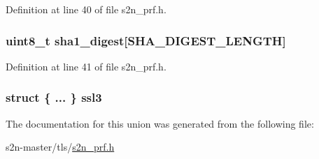Definition at line 40 of file s2n\+\_\+prf.\+h.

\subsubsection[{\texorpdfstring{sha1\+\_\+digest}{sha1_digest}}]{\setlength{\rightskip}{0pt plus 5cm}uint8\+\_\+t sha1\+\_\+digest\mbox{[}{\bf S\+H\+A\+\_\+\+D\+I\+G\+E\+S\+T\+\_\+\+L\+E\+N\+G\+TH}\mbox{]}}\hypertarget{unions2n__prf__working__space_aafe84edb27d60fa2bfa80666cb471f61}{}\label{unions2n__prf__working__space_aafe84edb27d60fa2bfa80666cb471f61}


Definition at line 41 of file s2n\+\_\+prf.\+h.

\subsubsection[{\texorpdfstring{ssl3}{ssl3}}]{\setlength{\rightskip}{0pt plus 5cm}struct \{ ... \}   ssl3}\hypertarget{unions2n__prf__working__space_a69a67fe1079d52ab6ddb417f6256810d}{}\label{unions2n__prf__working__space_a69a67fe1079d52ab6ddb417f6256810d}


The documentation for this union was generated from the following file\+:\begin{DoxyCompactItemize}
\item 
s2n-\/master/tls/\hyperlink{s2n__prf_8h}{s2n\+\_\+prf.\+h}\end{DoxyCompactItemize}
